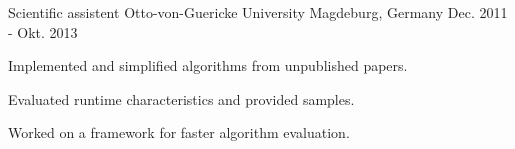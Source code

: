 \begin{cventries}

\cventry
{Scientific assistent} %
{Otto-von-Guericke University} %
{Magdeburg, Germany} %
{Dec. 2011 - Okt. 2013} %
{ %
\begin{cvitems}
\item {Implemented and simplified algorithms from unpublished papers.}
\item {Evaluated runtime characteristics and provided samples.}
\item {Worked on a framework for faster algorithm evaluation.}
\end{cvitems} 
}


\end{cventries}